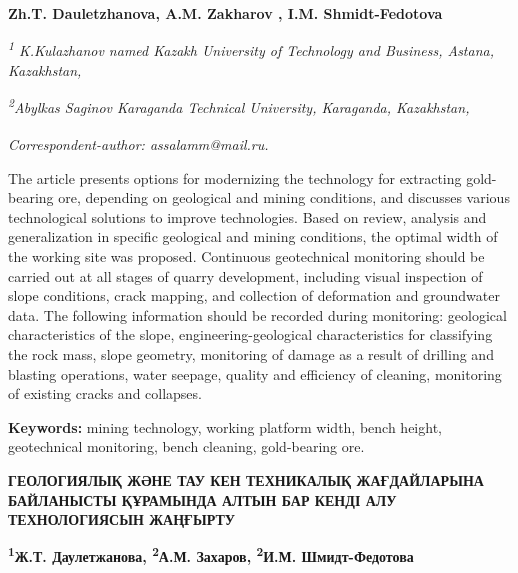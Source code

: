 
\begin{articleheader}

{\bfseries
Zh.T. Dauletzhanova,
A.M. Zakharov\textsuperscript{\envelope } ,
I.M. Shmidt-Fedotova}
\end{articleheader}

\begin{affiliation}
\emph{\textsuperscript{1} K.Kulazhanov named Kazakh University of Technology and Business, Astana, Kazakhstan,}

\emph{\textsuperscript{2}Abylkas Saginov Karaganda Technical University, Karaganda, Kazakhstan,}

\raggedright \textsuperscript{\envelope }{\em Correspondent-author: \emph{assalamm@mail.ru.}}
\end{affiliation}

The article presents options for modernizing the technology for
extracting gold-bearing ore, depending on geological and mining
conditions, and discusses various technological solutions to improve
technologies. Based on review, analysis and generalization in specific
geological and mining conditions, the optimal width of the working site
was proposed. Continuous geotechnical monitoring should be carried out
at all stages of quarry development, including visual inspection of
slope conditions, crack mapping, and collection of deformation and
groundwater data. The following information should be recorded during
monitoring: geological characteristics of the slope,
engineering-geological characteristics for classifying the rock mass,
slope geometry, monitoring of damage as a result of drilling and
blasting operations, water seepage, quality and efficiency of cleaning,
monitoring of existing cracks and collapses.

{\bfseries Keywords:} mining technology, working platform width, bench height,
geotechnical monitoring, bench cleaning, gold-bearing ore.

\begin{articleheader}
{\bfseries ГЕОЛОГИЯЛЫҚ ЖӘНЕ ТАУ КЕН ТЕХНИКАЛЫҚ ЖАҒДАЙЛАРЫНА БАЙЛАНЫСТЫ ҚҰРАМЫНДА АЛТЫН БАР КЕНДІ АЛУ ТЕХНОЛОГИЯСЫН ЖАҢҒЫРТУ}

{\bfseries
\textsuperscript{1}Ж.Т. Даулетжанова,
\textsuperscript{2}А.М. Захаров\textsuperscript{\envelope },
\textsuperscript{2}И.М. Шмидт-Федотова}
\end{articleheader}

